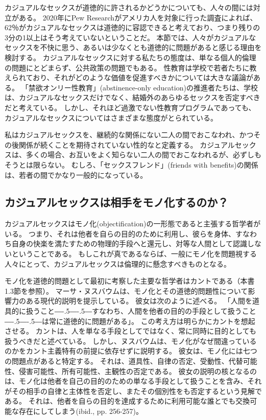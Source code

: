 \documentclass[paper=a4,book,openany]{jlreq}
\def\DDASH{―\kern-.5\zw―\kern-.5\zw―}
\begin{document}
カジュアルなセックスが道徳的に許されるかどうかについても、人々の間には対立がある。
2020年にPew Researchがアメリカ人を対象に行った調査によれば、62％がカジュアルなセックスは道徳的に容認できると考えており、つまり残りの3分の1以上はそう考えていないということだ\citep{brow20:_near_half_u}。
本節では、人々がカジュアルなセックスを不快に思う、あるいは少なくとも道徳的に問題があると感じる理由を検討する。
カジュアルなセックスに対する私たちの態度は、単なる個人的倫理の問題にとどまらず、公共政策の問題でもある。
性教育は学校で若者たちに教えられており、それがどのような価値を促進すべきかについては大きな議論がある。
「禁欲オンリー性教育」(abstinence-only education)の推進者たちは、学校は、カジュアルなセックスだけでなく、結婚外のあらゆるセックスを否定すべきだと考えている。
しかし、それほど過激でない性教育プログラムであっても、カジュアルなセックスについてはさまざまな態度がとられている。

私はカジュアルセックスを、継続的な関係にない二人の間でおこなわれ、かつその後関係が続くことを期待されていない性的なと定義する。
カジュアルセックスは、多くの場合、お互いをよく知らない二人の間でおこなわれるが、必ずしもそうとは限らない。
むしろ、「セックスフレンド」(friends with benefits)の関係は、若者の間でかなり一般的になっている\citep{dube17:_why_frien_benef}。

\subsection{カジュアルセックスは相手をモノ化するのか？}

カジュアルセックスはモノ化(objectification)の一形態であると主張する哲学者がいる。
つまり、それは他者を自らの目的のために利用し、彼らを身体、すなわち自身の快楽を満たすための物理的手段へと還元し、対等な人間として認識しないということである。
もしこれが真であるならば、一般にモノ化を問題視する人々にとって、カジュアルセックスは倫理的に懸念すべきものとなる。

モノ化を道徳的問題として最初に考察した主要な哲学者はカントである（本書1.3節を参照）。
マーサ・ヌスバウムは、モノ化とその道徳的問題性について影響力のある現代的説明を提示している。
彼女は次のように述べる。
「人間を道具的に扱うこと{\DDASH}すなわち、人間を他者の目的の手段として扱うこと{\DDASH}は常に道徳的に問題がある」\citep[p.289]{nussbaum95:_objec}。
この考え方は明らかにカントを想起させる。
カントは、人を単なる手段としてではなく、常に同時に目的としても扱うべきだと述べている。
しかし、ヌスバウムは、モノ化がなぜ間違っているのかをカント主義特有の前提に依存せずに説明する。
彼女は、モノ化には七つの問題点があると特定する。
それは、道具性、自律の否定、受動性、代替可能性、侵害可能性、所有可能性、主観性の否定である。
彼女の説明の核となるのは、モノ化は他者を自己の目的のための単なる手段として扱うことを含み、それがその相手の自律と主体性を否定し、またその個別性をも否定するという見解である。
それは、他者を自らの目的を達成するために利用可能な誰とでも交換可能な存在にしてしまう(ibid., pp. 256-257)。
\end{document}
